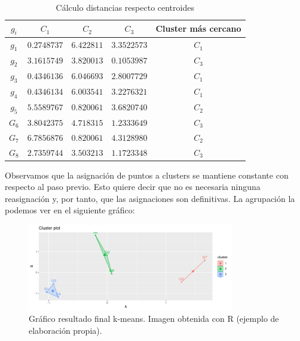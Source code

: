 \begin{ejemplo}
    \begin{table}[h]
        \centering
        \begin{tabular}{|c|c|c|c|c|}
            \hline
            \textbf{$g_{i}$} & \textbf{$C_{1}$} & \textbf{$C_{2}$} & \textbf{$C_{3}$} & \textbf{Cluster más cercano}\\
            \hline
            $g_{1}$ & $0.2748737$ & $6.422811$ & $3.3522573$ & $C_{1}$\\
            \hline
            $g_{2}$ & $3.1615749$ & $3.820013$  & $0.1053987$ & $C_{3}$\\
            \hline
            $g_{3}$ & $0.4346136$ & $6.046693$ & $2.8007729$ & $C_{1}$\\
            \hline
            $g_{4}$ & $0.4346134$ & $6.003541$ & $3.2276321$ & $C_{1}$\\
            \hline
            $g_{5}$ & $5.5589767$ & $0.820061$ & $3.6820740$ & $C_{2}$\\
            \hline
            $G_{6}$ & $3.8042375$ & $4.718315$ & $1.2333649$ & $C_{3}$\\
            \hline
            $G_{7}$ & $6.7856876$ & $0.820061$ & $4.3128980$ & $C_{2}$\\
            \hline
            $G_{8}$ & $2.7359744$ & $3.503213$ & $1.1723348$ & $C_{3}$ \\
            \hline
            
        \end{tabular}
        \caption{Cálculo distancias respecto centroides}

    \end{table}

    Observamos que la asignación de puntos a clusters se mantiene constante con respecto al paso previo. Esto quiere decir que no es necesaria ninguna
    reasignación y, por tanto, que las asignaciones son definitivas. La agrupación la podemos ver en el siguiente gráfico:

    \begin{figure}[h]
        \centering
        \includegraphics[width=0.8\textwidth]{../img/kmeans.png}
        \caption{Gráfico resultado final k-means. Imagen obtenida con R (ejemplo de elaboración propia).}
    \end{figure}
    
    
\end{ejemplo}

